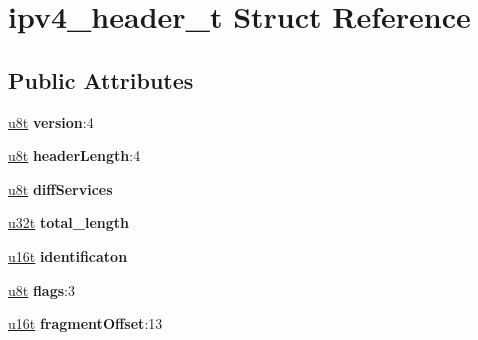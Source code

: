 \hypertarget{structipv4__header__t}{}\section{ipv4\+\_\+header\+\_\+t Struct Reference}
\label{structipv4__header__t}
\subsection*{Public Attributes}
\begin{DoxyCompactItemize}
\item 
\mbox{\label{structipv4__header__t_ac188d1ae5ea19139be084aabea16ecb1}} 
\hyperlink{macros_8h_a176a4ab0531a048e0693a4520c550193}{u8t} {\bfseries version}\+:4
\item 
\mbox{\label{structipv4__header__t_ac11ce6acd566bf026316c761fc9532fd}} 
\hyperlink{macros_8h_a176a4ab0531a048e0693a4520c550193}{u8t} {\bfseries header\+Length}\+:4
\item 
\mbox{\label{structipv4__header__t_a55f855624993b828721755ec8942256d}} 
\hyperlink{macros_8h_a176a4ab0531a048e0693a4520c550193}{u8t} {\bfseries diff\+Services}
\item 
\mbox{\label{structipv4__header__t_a3503c52bc9b72749fb422fa108dd15f8}} 
\hyperlink{macros_8h_a464a07ed2c6d005d677113cc44750a64}{u32t} {\bfseries total\+\_\+length}
\item 
\mbox{\label{structipv4__header__t_a039763ed73f6968b0a6cecf4f144fe85}} 
\hyperlink{macros_8h_a590a9a8f7df8fabfac6573e21da1922d}{u16t} {\bfseries identificaton}
\item 
\mbox{\label{structipv4__header__t_a7865e9fdc047af71d5bf561256bc5081}} 
\hyperlink{macros_8h_a176a4ab0531a048e0693a4520c550193}{u8t} {\bfseries flags}\+:3
\item 
\mbox{\label{structipv4__header__t_a5b4f68e31a631a875b616d6c389936ce}} 
\hyperlink{macros_8h_a590a9a8f7df8fabfac6573e21da1922d}{u16t} {\bfseries fragment\+Offset}\+:13
\item 
\mbox{\label{structipv4__header__t_a43c20799b97f008f7eb1226329078b89}} 

\end{DoxyCompactItemize}
